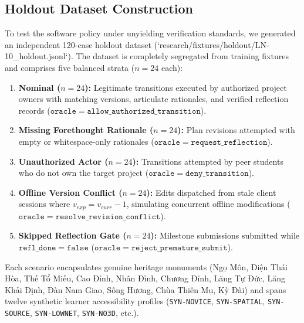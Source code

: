 \documentclass[11pt,a4paper]{article}
\begin{document}
\subsection{Holdout Dataset Construction}
To test the software policy under unyielding verification standards, we generated an independent 120-case holdout dataset (`research/fixtures/holdout/LN-10_holdout.jsonl`). The dataset is completely segregated from training fixtures and comprises five balanced strata ($n=24$ each):
\begin{enumerate}
    \item \textbf{Nominal ($n=24$):} Legitimate transitions executed by authorized project owners with matching versions, articulate rationales, and verified reflection records ($\mathtt{oracle} = \mathtt{allow\_authorized\_transition}$).
    \item \textbf{Missing Forethought Rationale ($n=24$):} Plan revisions attempted with empty or whitespace-only rationales ($\mathtt{oracle} = \mathtt{request\_reflection}$).
    \item \textbf{Unauthorized Actor ($n=24$):} Transitions attempted by peer students who do not own the target project ($\mathtt{oracle} = \mathtt{deny\_transition}$).
    \item \textbf{Offline Version Conflict ($n=24$):} Edits dispatched from stale client sessions where $v_{exp} = v_{curr} - 1$, simulating concurrent offline modifications ($\mathtt{oracle} = \mathtt{resolve\_revision\_conflict}$).
    \item \textbf{Skipped Reflection Gate ($n=24$):} Milestone submissions submitted while $\mathtt{refl\_done} = \mathtt{false}$ ($\mathtt{oracle} = \mathtt{reject\_premature\_submit}$).
\end{enumerate}

Each scenario encapsulates genuine heritage monuments (Ngọ Môn, Điện Thái Hòa, Thế Tổ Miếu, Cao Đỉnh, Nhân Đỉnh, Chương Đỉnh, Lăng Tự Đức, Lăng Khải Định, Đàn Nam Giao, Sông Hương, Chùa Thiên Mụ, Kỳ Đài) and spans twelve synthetic learner accessibility profiles (\texttt{SYN-NOVICE}, \texttt{SYN-SPATIAL}, \texttt{SYN-SOURCE}, \texttt{SYN-LOWNET}, \texttt{SYN-NO3D}, etc.).
\end{document}
